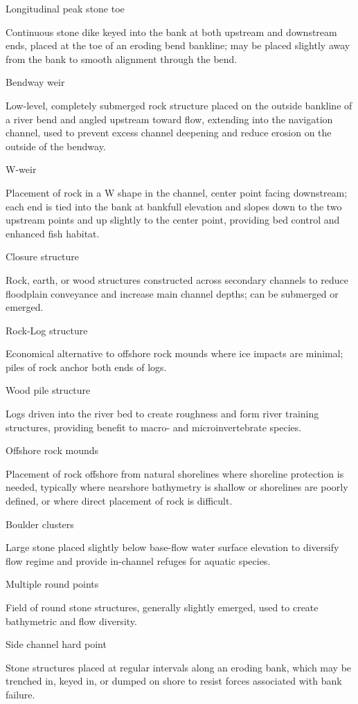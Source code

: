 \documentclass[
  letterpaper,
  DIV=11,
  numbers=noendperiod]{scrreprt}
\begin{document}
Longitudinal peak stone toe

Continuous stone dike keyed into the bank at both upstream and
downstream ends, placed at the toe of an eroding bend bankline; may be
placed slightly away from the bank to smooth alignment through the bend.

Bendway weir

Low-level, completely submerged rock structure placed on the outside
bankline of a river bend and angled upstream toward flow, extending into
the navigation channel, used to prevent excess channel deepening and
reduce erosion on the outside of the bendway.

W-weir

Placement of rock in a W shape in the channel, center point facing
downstream; each end is tied into the bank at bankfull elevation and
slopes down to the two upstream points and up slightly to the center
point, providing bed control and enhanced fish habitat.

Closure structure

Rock, earth, or wood structures constructed across secondary channels to
reduce floodplain conveyance and increase main channel depths; can be
submerged or emerged.

Rock-Log structure

Economical alternative to offshore rock mounds where ice impacts are
minimal; piles of rock anchor both ends of logs.

Wood pile structure

Logs driven into the river bed to create roughness and form river
training structures, providing benefit to macro- and microinvertebrate
species.

Offshore rock mounds

Placement of rock offshore from natural shorelines where shoreline
protection is needed, typically where nearshore bathymetry is shallow or
shorelines are poorly defined, or where direct placement of rock is
difficult.

Boulder clusters

Large stone placed slightly below base-flow water surface elevation to
diversify flow regime and provide in-channel refuges for aquatic
species.

Multiple round points

Field of round stone structures, generally slightly emerged, used to
create bathymetric and flow diversity.

Side channel hard point

Stone structures placed at regular intervals along an eroding bank,
which may be trenched in, keyed in, or dumped on shore to resist forces
associated with bank failure.
\end{document}
